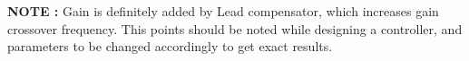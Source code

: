 \begin{enumerate}[label=\thesection.\arabic*.,ref=\thesection.\theenumi]
\textbf{NOTE :} Gain is definitely added by Lead compensator, which increases gain crossover frequency. This points should be noted while designing a controller, and parameters to be changed accordingly to get exact results.











\end{enumerate}     
